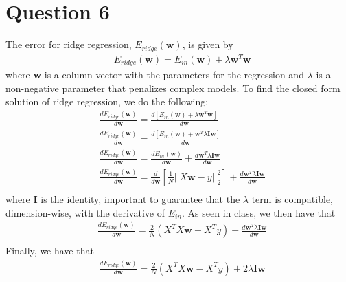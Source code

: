 \documentclass[leqno]{article}
\begin{document}
\section*{Question 6} The error for ridge regression, $E_{ridge}(\textbf{w})$, is given by
\begin{equation*}
\begin{split}
& E_{ridge}(\textbf{w}) = E_{in}(\textbf{w}) + \lambda\textbf{w}^T\textbf{w} 
\end{split}
\end{equation*}    
where \textbf{w} is a column vector with the parameters for the regression and $\lambda$ is a non-negative 
parameter that penalizes complex models. To find the closed form solution of ridge regression, we do the following:
\begin{equation*}
\begin{split}
& \frac{dE_{ridge}(\textbf{w})}{d\textbf{w}} = \frac{d[E_{in}(\textbf{w}) + \lambda\textbf{w}^T\textbf{w}]}{d\textbf{w}}\\
& \frac{dE_{ridge}(\textbf{w})}{d\textbf{w}} = \frac{d[E_{in}(\textbf{w}) + \textbf{w}^T\lambda\textbf{I}\textbf{w}]}{d\textbf{w}}\\
& \frac{dE_{ridge}(\textbf{w})}{d\textbf{w}} = \frac{dE_{in}(\textbf{w})}{d\textbf{w}} + \frac{d\textbf{w}^T\lambda\textbf{I}\textbf{w}}{d\textbf{w}}\\
& \frac{dE_{ridge}(\textbf{w})}{d\textbf{w}} = \frac{d}{d\textbf{w}}[\frac{1}{N}||X\textbf{w} - y||^2_2] + \frac{d\textbf{w}^T\lambda\textbf{I}\textbf{w}}{d\textbf{w}}\\
\end{split}
\end{equation*}
where \textbf{I} is the identity, important to guarantee that the $\lambda$ term is compatible, dimension-wise, with the derivative of $E_{in}$. As seen in class, 
we then have that
\begin{equation*}
\begin{split}
& \frac{dE_{ridge}(\textbf{w})}{d\textbf{w}} = \frac{2}{N}(X^TX\textbf{w} - X^Ty) + \frac{d\textbf{w}^T\lambda\textbf{I}\textbf{w}}{d\textbf{w}}\\
\end{split}
\end{equation*}
Finally, we have that
\begin{equation*}
\begin{split}
& \frac{dE_{ridge}(\textbf{w})}{d\textbf{w}} = \frac{2}{N}(X^TX\textbf{w} - X^Ty) + 2\lambda\textbf{I}\textbf{w}\\
\end{split}
\end{equation*}
\end{document}
